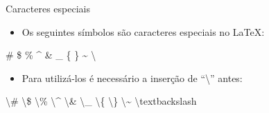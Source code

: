 \begin{frame}{Caracteres especiais}
	\begin{itemize}
	\item Os seguintes símbolos são caracteres especiais no \LaTeX:
	\end{itemize}

	\alert{\# \$ \% \^{} \& \_ \{ \} \~{} \textbackslash}

	\begin{itemize}
	\item Para utilizá-los é necessário a inserção de ``\textbackslash'' antes:
	\end{itemize}

	\alert{
	   \textbackslash\# 
	   \textbackslash\$ 
	   \textbackslash\% 
	   \textbackslash\^{} 
	   \textbackslash\& 
	   \textbackslash\_ 
	   \textbackslash\{ 
	   \textbackslash\} 
	   \textbackslash\~{} 
	   \textbackslash textbackslash
	}
\end{frame}


